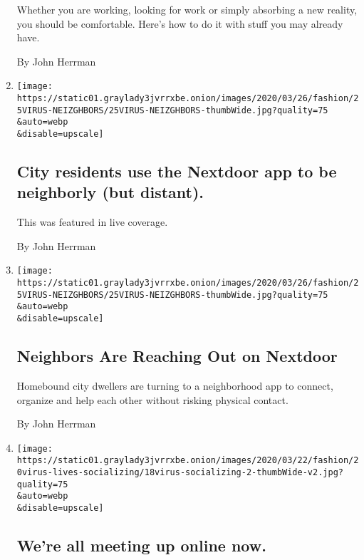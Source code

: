 \begin{enumerate}
  Whether you are working, looking for work or simply absorbing a new
  reality, you should be comfortable. Here's how to do it with stuff you
  may already have.

  By John Herrman
\item
  \href{/live/2020/coronavirus-usa-live-03-25/city-residents-use-the-nextdoor-app-to-be-neighborly-but-distant}{}

  \texttt{[image: https://static01.graylady3jvrrxbe.onion/images/2020/03/26/fashion/25VIRUS-NEIZGHBORS/25VIRUS-NEIZGHBORS-thumbWide.jpg?quality=75\\\&auto=webp\\\&disable=upscale]}

  \hypertarget{city-residents-use-the-nextdoor-app-to-be-neighborly-but-distant}{%
  \subsection{City residents use the Nextdoor app to be neighborly (but
  distant).}\label{city-residents-use-the-nextdoor-app-to-be-neighborly-but-distant}}

  This was featured in live coverage.

  By John Herrman
\item
  \href{/2020/03/25/style/nextdoor-neighbors-coronavirus.html}{}

  \texttt{[image: https://static01.graylady3jvrrxbe.onion/images/2020/03/26/fashion/25VIRUS-NEIZGHBORS/25VIRUS-NEIZGHBORS-thumbWide.jpg?quality=75\\\&auto=webp\\\&disable=upscale]}

  \hypertarget{neighbors-are-reaching-out-on-nextdoor}{%
  \subsection{Neighbors Are Reaching Out on
  Nextdoor}\label{neighbors-are-reaching-out-on-nextdoor}}

  Homebound city dwellers are turning to a neighborhood app to connect,
  organize and help each other without risking physical contact.

  By John Herrman
\item
  \href{/live/2020/coronavirus-covid-20/were-all-meeting-up-online-now}{}

  \texttt{[image: https://static01.graylady3jvrrxbe.onion/images/2020/03/22/fashion/20virus-lives-socializing/18virus-socializing-2-thumbWide-v2.jpg?quality=75\\\&auto=webp\\\&disable=upscale]}

  \hypertarget{were-all-meeting-up-online-now}{%
  \subsection{We're all meeting up online
  now.}\label{were-all-meeting-up-online-now}}


\end{enumerate}
